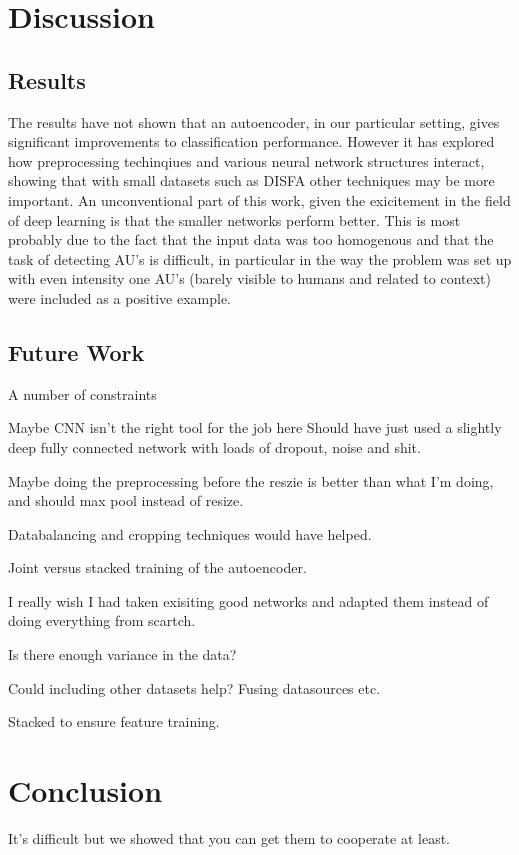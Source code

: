 \chapter{Discussion}
  \section{Results}
    The results have not shown that an autoencoder, in our particular setting,
    gives significant improvements to classification performance. However it has
    explored how preprocessing techinqiues and various neural network structures
    interact, showing that with small datasets such as DISFA other techniques may
    be more important. An unconventional part of this work, given the exicitement
    in the field of deep learning is that the smaller networks perform better.
    This is most probably due to the fact that the input data was too homogenous
    and that the task of detecting AU's is difficult, in particular in the way the problem was set up
    with even intensity one AU's (barely visible to humans and related to context)
    were included as a positive example.


  \section{Future Work}
    A number of constraints

  Maybe CNN isn't the right tool for the job here
  Should have just used a slightly deep fully connected network
  with loads of dropout, noise and shit.

  Maybe doing the preprocessing before the reszie is better than what I'm doing,
  and should max pool instead of resize.

  Databalancing and cropping techniques would have helped.

  Joint versus stacked training of the autoencoder.

  I really wish I had taken exisiting good networks and adapted them instead of doing
  everything from scartch.

  Is there enough variance in the data?

  Could including other datasets help? Fusing datasources etc.

  Stacked to ensure feature training.

\chapter{Conclusion}
  It's difficult but we showed that you can get them to cooperate at least.
